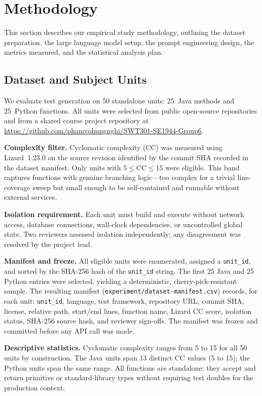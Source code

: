 \documentclass[conference]{IEEEtran}
\begin{document}
\section{Methodology}
\label{sec:methodology}

This section describes our empirical study methodology, outlining the dataset
preparation, the large language model setup, the prompt engineering design, the
metrics measured, and the statistical analysis plan.

\subsection{Dataset and Subject Units}
\label{subsec:dataset}

We evaluate test generation on 50 standalone units: 25~Java methods and
25~Python functions.
All units were selected from public open-source repositories and from a shared
course project repository at
\url{https://github.com/phamvohungnghi/SWT301-SE1944-Group6}.

\textbf{Complexity filter.}
Cyclomatic complexity (CC) was measured using Lizard~1.23.0 on the source
revision identified by the commit SHA recorded in the dataset manifest.
Only units with $5 \le \text{CC} \le 15$ were eligible.
This band captures functions with genuine branching logic---too complex for a
trivial line-coverage sweep but small enough to be self-contained and runnable
without external services.

\textbf{Isolation requirement.}
Each unit must build and execute without network access, database connections,
wall-clock dependencies, or uncontrolled global state.
Two reviewers assessed isolation independently; any disagreement was resolved by
the project lead.

\textbf{Manifest and freeze.}
All eligible units were enumerated, assigned a \texttt{unit\_id}, and sorted by
the SHA-256 hash of the \texttt{unit\_id} string.
The first 25 Java and 25 Python entries were selected, yielding a deterministic,
cherry-pick-resistant sample.
The resulting manifest (\texttt{experiment/dataset-manifest.csv}) records, for
each unit: \texttt{unit\_id}, language, test framework, repository URL, commit
SHA, license, relative path, start/end lines, function name, Lizard CC score,
isolation status, SHA-256 source hash, and reviewer sign-offs.
The manifest was frozen and committed before any API call was made.

\textbf{Descriptive statistics.}
Cyclomatic complexity ranges from 5 to 15 for all 50 units by construction.
The Java units span 13 distinct CC values (5 to 15); the Python units span the
same range.
All functions are standalone: they accept and return primitive or standard-library
types without requiring test doubles for the production context.
\end{document}
